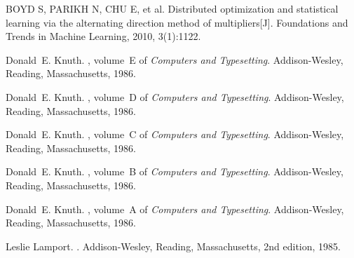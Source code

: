 
\begin{thebibliography}{10}

BOYD S, PARIKH N, CHU E, et al. Distributed optimization and statistical learning via the
alternating direction method of multipliers[J]. Foundations and Trends in Machine Learning,
2010, 3(1):1­122.

Donald~E. Knuth.
, volume~E of {\em Computers and
  Typesetting}.
\newblock Addison-Wesley, Reading, Massachusetts, 1986.

Donald~E. Knuth.
, volume~D of {\em Computers and
  Typesetting}.
\newblock Addison-Wesley, Reading, Massachusetts, 1986.

Donald~E. Knuth.
, volume~C of {\em Computers and
  Typesetting}.
\newblock Addison-Wesley, Reading, Massachusetts, 1986.

Donald~E. Knuth.
, volume~B of {\em Computers and
  Typesetting}.
\newblock Addison-Wesley, Reading, Massachusetts, 1986.

Donald~E. Knuth.
, volume~A of {\em Computers and Typesetting}.
\newblock Addison-Wesley, Reading, Massachusetts, 1986.

Leslie Lamport.
.
\newblock Addison-Wesley, Reading, Massachusetts, 2nd edition, 1985.

\end{thebibliography}
